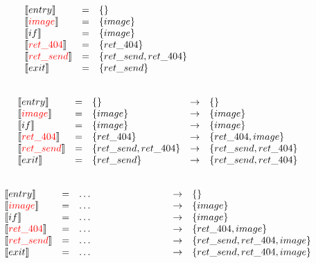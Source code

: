 \begin{frame}
\[
\begin{array}{lclcl}
  \constraint{entry} & = & \{\} &&\\
  \assignconstraint{image} & = & \{image\} &&\\
  \constraint{if} & = & \{image\} &&\\
  \assignconstraint{ret\_404} & = & \{ret\_404\} &&\\
  \assignconstraint{ret\_send} & = & \{ret\_send, ret\_404\} &&\\
  \constraint{exit} & = & \{ret\_send\} &&\\
  && \phantom{\{command, param\}} && \phantom{\{command, param\}}
\end{array}
\]
\end{frame}

\begin{frame}
\[
\begin{array}{lclcl}
  \constraint{entry} & = & \{\} & \rightarrow & \{\}\\
  \assignconstraint{image} & = & \{image\} & \rightarrow &\{image\}\\
  \constraint{if} & = & \{image\} & \rightarrow &\{image\}\\
  \assignconstraint{ret\_404} & = & \{ret\_404\} & \rightarrow &\{ret\_404, image\}\\
  \assignconstraint{ret\_send} & = & \{ret\_send, ret\_404\} & \rightarrow &\{ret\_send, ret\_404\}\\
  \constraint{exit} & = & \{ret\_send\} & \rightarrow & \{ret\_send, ret\_404\}\\
  && \phantom{\{command, param\}} && \phantom{\{command, param\}}
\end{array}
\]
\end{frame}

\begin{frame}
\[
\begin{array}{lclcl}
  \constraint{entry} & = & \dots & \rightarrow & \{\}\\
  \assignconstraint{image} & = & \dots & \rightarrow &\{image\}\\
  \constraint{if} & = & \dots & \rightarrow &\{image\}\\
  \assignconstraint{ret\_404} & = & \dots & \rightarrow &\{ret\_404, image\}\\
  \assignconstraint{ret\_send} & = & \dots & \rightarrow &\{ret\_send, ret\_404, image\}\\
  \constraint{exit} & = & \dots & \rightarrow & \{ret\_send, ret\_404, image\}\\
  && \phantom{\{command, param\}} && \phantom{\{command, param\}}
\end{array}
\]
\end{frame}

